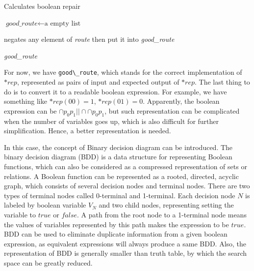 \documentclass[10pt,journal,final,]{article}
\theoremstyle{definition}
\begin{document}
\begin{algorithm}
\caption{Calculates boolean repair}
\begin{algorithmic}[1]
\STATE $\textit{good\_route} \gets \text{a empty list}$
\STATE

  \STATE negates any element of \textit{route} then put it into \textit{good\_route}
\ENDFOR

\STATE
\RETURN \textit{good\_route}

\end{algorithmic}
\end{algorithm}

For now, we have \lstinline|good\_route|, which stands for the correct implementation of $*rep$, represented as pairs of input and expected output of $*rep$. The last thing to do is to convert it to a readable boolean expression.
For example, we have something like $*rep(00) = 1$, $*rep(01) = 0$. Apparently, the boolean expression can be $\cap{p_{0}p_{1}} || \cap{\cap{p_{0}}p_{1}}$,
but such representation can be complicated when the number of variables goes up, which is also difficult for further simplification.
Hence, a better representation is needed.

In this case, the concept of Binary decision diagram\cite{BDD} can be introduced.
The binary decision diagram (BDD) is a data structure for representing Boolean functions, which can also be considered as a compressed representation of sets or relations\cite{TfEFVUBDD,FtOVOfBDD}.
A Boolean function can be represented as a rooted, directed, acyclic graph, which consists of several decision nodes and terminal nodes. There are two types of terminal nodes called 0-terminal and 1-terminal.
Each decision node $N$ is labeled by boolean variable $V_{N}$ and two child nodes, representing setting the variable to $true$ or $false$.
A path from the root node to a 1-terminal node means the values of variables represented by this path makes the expression to be $true$.
BDD can be used to eliminate duplicate information from a given boolean expression, as equivalent expressions will always produce a same BDD. Also, the representation of BDD is generally smaller than truth table,
by which the search space can be greatly reduced.
\end{document}
